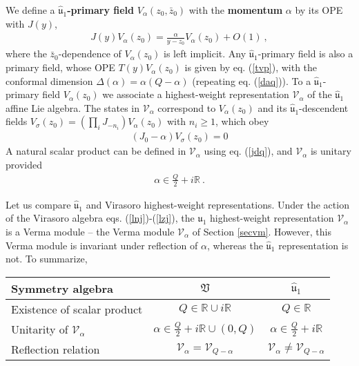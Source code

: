 \documentclass[12pt,a4paper,notitlepage]{report}
\newcommand \R {\mathbb{R}}
\numberwithin{equation}{section}
\theoremstyle{break}
\begin{document}
We define a \textbf{\boldmath $\hat{\mathfrak{u}}_1$-primary field} $V_{\alpha}(z_0,\bar{z}_0)$ with the \textbf{\boldmath momentum} $\alpha$ by its OPE with $J(y)$,
\begin{align}
 \boxed{J(y) V_\alpha(z_0) = \frac{\alpha}{y-z_0} V_\alpha(z_0) + O(1)}\ ,
\label{jva}
\end{align}
where the $\bar{z}_0$-dependence of $V_\alpha(z_0)$ is left implicit. 
Any $\hat{\mathfrak{u}}_1$-primary field is also a primary field, whose OPE $T(y)V_\alpha(z_0)$ is given by eq. (\ref{tvp}), with the conformal dimension $\Delta(\alpha) = \alpha(Q-\alpha)$ (repeating eq. (\ref{daq})). To a $\hat{\mathfrak{u}}_1$-primary field $V_\alpha(z_0)$ we associate a highest-weight representation $\mathcal{V}_\alpha$ of the $\hat{\mathfrak{u}}_1$ affine Lie algebra.
The states in $\mathcal{V}_\alpha$ correspond to $V_\alpha(z_0)$ and its $\hat{\mathfrak{u}}_1$-descendent fields $V_\sigma(z_0)=\left(\prod_i J_{-n_i}\right) V_\alpha(z_0)$ with $n_i\geq 1$, which obey 
\begin{align}
 \left(J_0 - \alpha\right) V_\sigma(z_0) = 0
\label{jma}
\end{align}
A natural scalar product can be defined in $\mathcal{V}_\alpha$ using eq. (\ref{jdq}), and $\mathcal{V}_\alpha$ is unitary provided
\begin{align}
 \alpha \in \frac{Q}{2} + i\R\ .
\label{aif}
\end{align}

Let us compare $\hat{\mathfrak{u}}_1$ and Virasoro highest-weight representations. 
Under the action of the Virasoro algebra eqs. (\ref{lnj})-(\ref{lzj}), the $\hat{\mathfrak{u}}_1$ highest-weight representation $\mathcal{V}_\alpha$ is a Verma module -- the Verma module $\mathcal{V}_\alpha$ of Section \ref{secvm}. However, this Verma module is invariant under reflection of $\alpha$, whereas the $\hat{\mathfrak{u}}_1$ representation is not. To summarize,
\begin{center}
\renewcommand{\arraystretch}{1.3}
 \begin{tabular}{|l|c|c|}
  \hline
 Symmetry algebra  & $\mathfrak{V}$ & $\hat{\mathfrak{u}}_1 $
\\
\hline\hline
 Existence of scalar product & $Q\in \R \cup i\R $ & $Q\in \R$ 
\\
\hline
 Unitarity of $\mathcal{V}_\alpha$ & $\alpha\in \frac{Q}{2}+i\R \cup (0,Q) $ & $\alpha \in \frac{Q}{2}+i\R$
\\
\hline 
 Reflection relation  & $\mathcal{V}_\alpha = \mathcal{V}_{Q-\alpha} $ & $\mathcal{V}_\alpha \neq \mathcal{V}_{Q-\alpha} $ 
\\
\hline
 \end{tabular}
\end{center}
\end{document}
